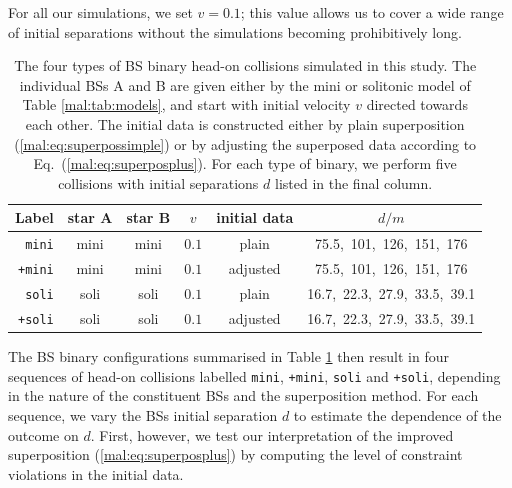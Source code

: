 For all our simulations, we
set $v=0.1$; this value
allows us to cover a wide range of initial separations 
without the simulations becoming prohibitively long.
%
\begin{table}[t]
    \centering
    \caption{The four types of BS binary head-on collisions simulated
    in this study. The individual BSs A and B are given either
    by the mini or solitonic model of Table \ref{mal:tab:models},
    and start with initial
    velocity $v$ directed towards each other. The initial data
    is constructed either by plain superposition
    (\ref{mal:eq:superpossimple}) or by adjusting
    the superposed data according to Eq.~(\ref{mal:eq:superposplus}).
    For each type of binary, we perform five collisions with
    initial separations $d$ listed in the final column.
    }
    \begin{tabular}{r|ccccc}
    \hline
    Label & star A & star B & $v$ & initial data & $d/m$ \\
    \hline
    {\tt mini} & mini & mini & $0.1$ & plain &
    75.5,~101,~126,~151,~176 \\
    {\tt +mini}& mini & mini & $0.1$ & adjusted &
    75.5,~101,~126,~151,~176 \\
    {\tt soli} & soli & soli & $0.1$ & plain &
    16.7,~22.3,~27.9,~33.5,~39.1 \\
    {\tt +soli} & soli & soli & $0.1$ &
    adjusted &
    16.7,~22.3,~27.9,~33.5,~39.1 \\
    \hline
    \end{tabular}
    \label{mal:tab:hods}
\end{table}
%
The BS binary configurations
summarised in Table \ref{mal:tab:hods} then result
in four sequences of head-on collisions labelled
{\tt mini}, {\tt +mini}, {\tt soli} and {\tt +soli},
depending in the nature of the constituent BSs and
the superposition method. For each sequence, we vary the
BSs initial separation $d$ to estimate the dependence of the
outcome on $d$. First, however, we test our interpretation
of the improved superposition (\ref{mal:eq:superposplus})
by computing the level of constraint violations in the
initial data.
